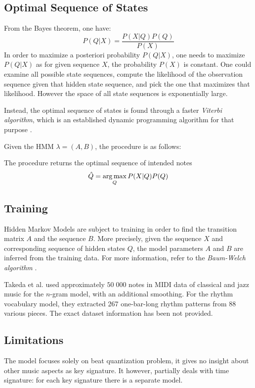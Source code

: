 \subsection{Optimal Sequence of States}

From the Bayes theorem, one have: $$P(Q|X)=\frac{P(X|Q)P(Q)}{P(X)}$$ In order to maximize a posteriori probability $P(Q|X)$, one needs to maximize $P(Q|X)$ as for given sequence $X$, the probability $P(X)$ is constant. One could examine all possible state sequences, compute the likelihood of the observation sequence given that hidden state sequence, and pick the one that maximizes that likelihood. However the space of all state sequences is exponentially large.

Instead, the optimal sequence of states is found through a faster \emph{Viterbi algorithm}, which is an established dynamic programming algorithm for that purpose \cite[p.210--220]{Jurafsky2009}. 

Given the HMM $\lambda = (A, B)$, the procedure is as follows:



The procedure returns the optimal sequence of intended notes $$\hat{Q} = \argmax_Q P(X|Q)P(Q)$$

\subsection{Training}

Hidden Markov Models are subject to training in order to find the transition matrix $A$ and the sequence $B$. More precisely, given the sequence $X$ and corresponding sequence of hidden states $Q$, the model parameters $A$ and $B$ are inferred from the training data. For more information, refer to the \emph{Baum-Welch algorithm} \cite[p. 220--226]{Jurafsky2009}.

Takeda et al. used approximately $50\;000$ notes in MIDI data of classical and jazz music for the $n$-gram model, with an additional smoothing. For the rhythm vocabulary model, they extracted 267 one-bar-long rhythm patterns from 88 various pieces. The exact dataset information has been not provided.

\subsection{Limitations}

The model focuses solely on beat quantization problem, it gives no insight about other music aspects as key signature. It however, partially deals with time signature: for each key signature there is a separate model.

